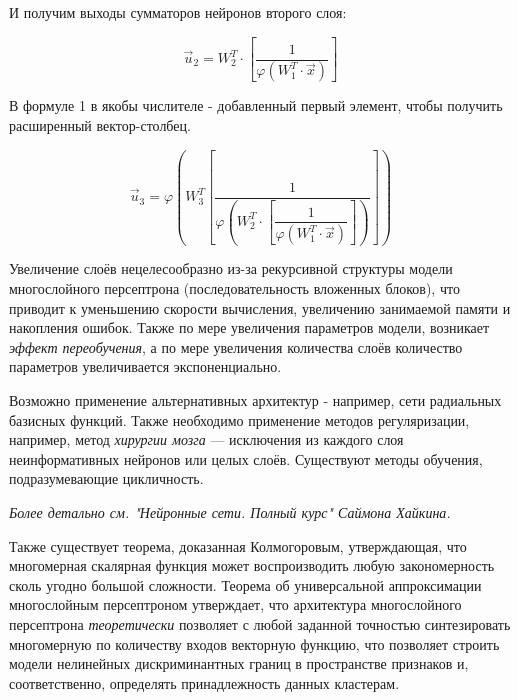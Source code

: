 \documentclass[a4paper]{article}
\numberwithin{equation}{subsection}
\begin{document}
И получим выходы сумматоров нейронов второго слоя:


\begin{equation}
    \vec{u}_2 = W_2^T \cdot [\dfrac{1}{\varphi(W_1^T \cdot \vec{x})}]
\end{equation}


В формуле 1 в якобы числителе - добавленный первый элемент, чтобы получить расширенный вектор-столбец.

\begin{equation}
    \vec{u}_3 = \varphi(W_3^T[\dfrac{1}{\varphi(W_2^T \cdot [\dfrac{1}{\varphi(W_1^T \cdot \vec{x})}])}])
\end{equation}



Увеличение слоёв нецелесообразно из-за рекурсивной структуры модели многослойного 
персептрона (последовательность вложенных блоков), что приводит к уменьшению 
скорости вычисления, увеличению занимаемой памяти и накопления ошибок.
Также по мере увеличения параметров модели, возникает \textit{эффект переобучения}, 
а по мере увеличения количества слоёв количество параметров увеличивается экспоненциально.

Возможно применение альтернативных архитектур - например, сети радиальных базисных функций.
Также необходимо применение методов регуляризации, например, метод \textit{хирургии мозга} ---
исключения из каждого слоя неинформативных нейронов или целых слоёв.
Существуют методы обучения, подразумевающие цикличность.

\begin{myquote}
    \textit{Более детально см. "Нейронные сети. Полный курс" Саймона Хайкина.}
\end{myquote}

Также существует теорема, доказанная Колмогоровым, утверждающая, что многомерная 
скалярная функция может воспроизводить любую закономерность сколь угодно большой 
сложности. Теорема об универсальной аппроксимации многослойным персептроном 
утверждает, что архитектура многослойного персептрона \textit{теоретически} 
позволяет с любой заданной точностью синтезировать многомерную по количеству 
входов векторную функцию, что позволяет строить модели нелинейных 
дискриминантных границ в пространстве признаков и, соответственно, определять 
принадлежность данных кластерам. 
\end{document}
